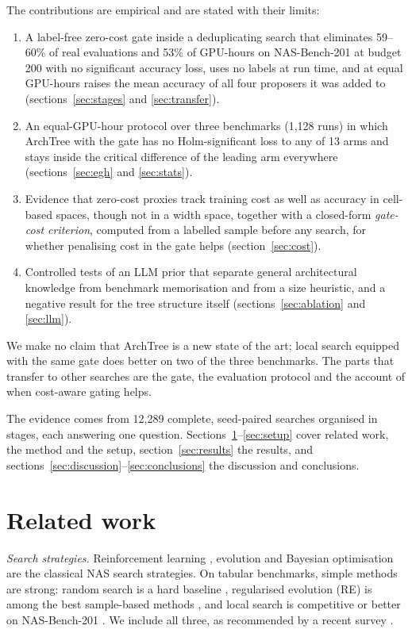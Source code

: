 \documentclass{sadhana}
\newcommand{\algname}{ArchTree}
\begin{document}
The contributions are empirical and are stated with their limits:
\begin{enumerate}
\item A label-free zero-cost gate inside a deduplicating search that eliminates 59--60\% of real evaluations and 53\% of GPU-hours on NAS-Bench-201 at budget 200 with no significant accuracy loss, uses no labels at run time, and at equal GPU-hours raises the mean accuracy of all four proposers it was added to (sections~\ref{sec:stages} and \ref{sec:transfer}).
\item An equal-GPU-hour protocol over three benchmarks (1,128 runs) in which \algname{} with the gate has no Holm-significant loss to any of 13 arms and stays inside the critical difference of the leading arm everywhere (sections~\ref{sec:egh} and \ref{sec:stats}).
\item Evidence that zero-cost proxies track training cost as well as accuracy in cell-based spaces, though not in a width space, together with a closed-form \emph{gate-cost criterion}, computed from a labelled sample before any search, for whether penalising cost in the gate helps (section~\ref{sec:cost}).
\item Controlled tests of an LLM prior that separate general architectural knowledge from benchmark memorisation and from a size heuristic, and a negative result for the tree structure itself (sections~\ref{sec:ablation} and \ref{sec:llm}).
\end{enumerate}
We make no claim that \algname{} is a new state of the art; local search equipped with the same gate does better on two of the three benchmarks. The parts that transfer to other searches are the gate, the evaluation protocol and the account of when cost-aware gating helps.

The evidence comes from 12,289 complete, seed-paired searches organised in stages, each answering one question. Sections~\ref{sec:related}--\ref{sec:setup} cover related work, the method and the setup, section~\ref{sec:results} the results, and sections~\ref{sec:discussion}--\ref{sec:conclusions} the discussion and conclusions.

\section{Related work}\label{sec:related}

\textit{Search strategies.} Reinforcement learning \cite{zoph2017,pham2018}, evolution \cite{real2017,real2019} and Bayesian optimisation \cite{white2021bananas} are the classical NAS search strategies. On tabular benchmarks, simple methods are strong: random search is a hard baseline \cite{li2020random,yang2020}, regularised evolution (RE) is among the best sample-based methods \cite{real2019,ying2019}, and local search is competitive or better on NAS-Bench-201 \cite{white2021ls}. We include all three, as recommended by a recent survey \cite{white2023}.
\end{document}
